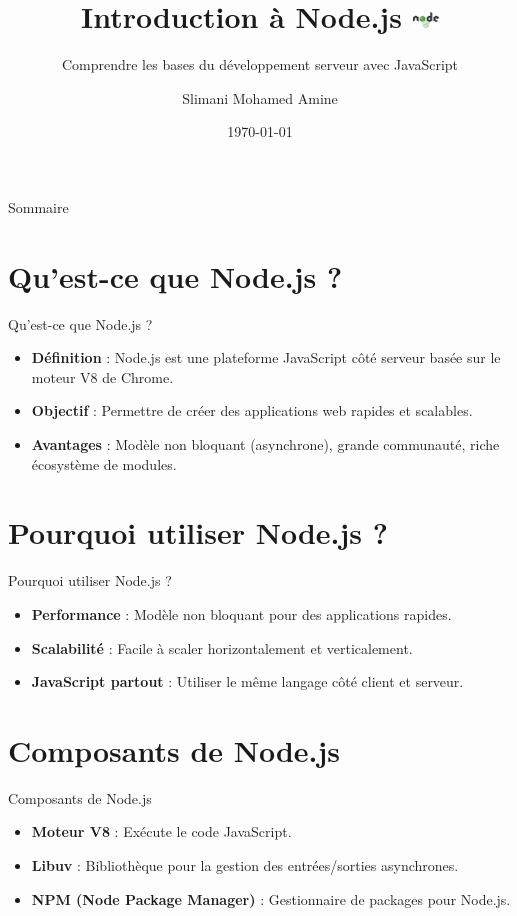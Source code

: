 \documentclass{clbeamer2024}
\title{
        Introduction à Node.js
	\includegraphics[width=0.7cm]{logos/node.png} \hfill
}
\subtitle{Comprendre les bases du développement serveur avec JavaScript}
\author{Slimani Mohamed Amine}
\institute{EHTP}
\date{\today}
\begin{document}
	\setcounter{framenumber}{-1}
	\frame{\titlepage}
	
	
	
	\begin{frame}{Sommaire}
		\tableofcontents
	\end{frame}
	
	\section{Qu'est-ce que Node.js ?}
	\begin{frame}{Qu'est-ce que Node.js ?}
		\begin{itemize}
			\item \textbf{Définition} : Node.js est une plateforme JavaScript côté serveur basée sur le moteur V8 de Chrome.
			\item \textbf{Objectif} : Permettre de créer des applications web rapides et scalables.
			\item \textbf{Avantages} : Modèle non bloquant (asynchrone), grande communauté, riche écosystème de modules.
		\end{itemize}
	\end{frame}
	
	
	\section{Pourquoi utiliser Node.js ?}
	\begin{frame}{Pourquoi utiliser Node.js ?}
		\begin{itemize}
			\item \textbf{Performance} : Modèle non bloquant pour des applications rapides.
			\item \textbf{Scalabilité} : Facile à scaler horizontalement et verticalement.
			\item \textbf{JavaScript partout} : Utiliser le même langage côté client et serveur.
		\end{itemize}
	\end{frame}
	
	
	\section{Composants de Node.js}
	\begin{frame}{Composants de Node.js}
		\begin{itemize}
			\item \textbf{Moteur V8} : Exécute le code JavaScript.
			\item \textbf{Libuv} : Bibliothèque pour la gestion des entrées/sorties asynchrones.
			\item \textbf{NPM (Node Package Manager)} : Gestionnaire de packages pour Node.js.
		\end{itemize}
	\end{frame}
	
\end{document}

